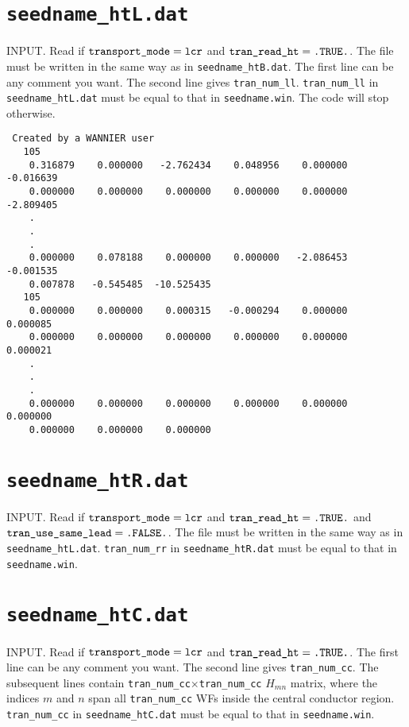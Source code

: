 \section{{\tt seedname\_htL.dat}}

INPUT.
Read if $\verb#transport_mode#=\verb#lcr#$
and $\verb#tran_read_ht#=\verb#.TRUE.#$.
The file must be written in the same way as 
in \verb#seedname_htB.dat#.
The first line can be any comment you want.
The second line gives \verb#tran_num_ll#.
\verb#tran_num_ll# in \verb#seedname_htL.dat#
must be equal to
that in \verb#seedname.win#. 
The code will stop otherwise.

\begin{verbatim}
 Created by a WANNIER user
   105
    0.316879    0.000000   -2.762434    0.048956    0.000000   -0.016639
    0.000000    0.000000    0.000000    0.000000    0.000000   -2.809405
    .
    .
    .
    0.000000    0.078188    0.000000    0.000000   -2.086453   -0.001535
    0.007878   -0.545485  -10.525435
   105
    0.000000    0.000000    0.000315   -0.000294    0.000000    0.000085
    0.000000    0.000000    0.000000    0.000000    0.000000    0.000021
    .
    .
    .
    0.000000    0.000000    0.000000    0.000000    0.000000    0.000000
    0.000000    0.000000    0.000000
\end{verbatim}

\section{{\tt seedname\_htR.dat}}

INPUT.
Read if $\verb#transport_mode#=\verb#lcr#$
and $\verb#tran_read_ht#=\verb#.TRUE.#$
and $\verb#tran_use_same_lead#=\verb#.FALSE.#$.
The file must be written in the same way as 
in \verb#seedname_htL.dat#.
\verb#tran_num_rr# in \verb#seedname_htR.dat#
must be equal to
that in \verb#seedname.win#. 

\section{{\tt seedname\_htC.dat}}

INPUT.
Read if $\verb#transport_mode#=\verb#lcr#$
and $\verb#tran_read_ht#=\verb#.TRUE.#$.
The first line can be any comment you want.
The second line gives \verb#tran_num_cc#.
The subsequent lines contain 
\verb#tran_num_cc#$\times$\verb#tran_num_cc#
$H_{mn}$ matrix, where the indices
$m$ and $n$ span all \verb#tran_num_cc# WFs
inside the central conductor region.
\verb#tran_num_cc# in \verb#seedname_htC.dat#
must be equal to
that in \verb#seedname.win#. 

